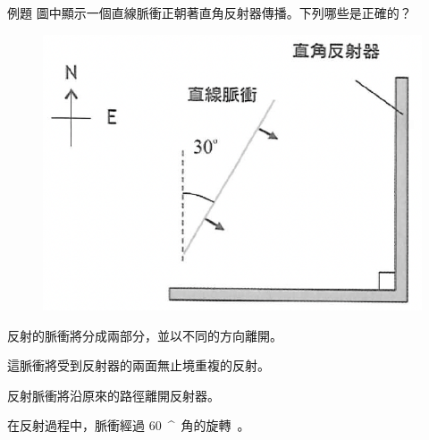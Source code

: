 \documentclass[13pt]{beamer}
\newcommand{\dg}[1]{ \qty{#1}{^{\circ}} }
\begin{document}
\begin{frame}{例題}
    圖中顯示一個直線脈衝正朝著直角反射器傳播。下列哪些是正確的？

    \begin{figure}
        \centering
        \includegraphics[width=0.4\linewidth]{images/Screenshot 2023-09-27 at 5.37.55 PM.png}
    \end{figure}
    \begin{mchoices}
        \item 反射的脈衝將分成兩部分，並以不同的方向離開。
        \item 這脈衝將受到反射器的兩面無止境重複的反射。
        \item 反射脈衝將沿原來的路徑離開反射器。
        \item 在反射過程中，脈衝經過\dg{60}角的旋轉。
    \end{mchoices}
\end{frame}
\end{document}
